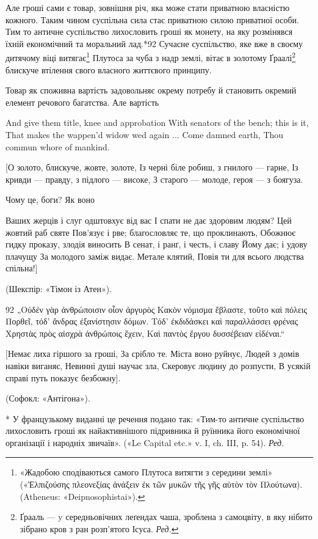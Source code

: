 Але гроші сами є товар, зовнішня річ, яка може стати приватною
власністю кожного. Таким чином суспільна сила стає приватною
силою приватної особи. Тим то античне суспільство лихословить
гроші як монету, на яку розмінявся їхній економічний та моральний
лад.*92 Сучасне суспільство, яке вже в своєму дитячому
віці витягає\footnote{
«Жадобою сподіваються самого Плутоса витягти з середини землі»
(«Ἐλπιζούσης  πλεονεξίας ἀνάξειν ἐκ τῶν μυκῶν τῆς γῆς αὐτὸν τὸν Πλούτωνα). (Atheneus:
«Deipnosophistai»).
} Плутоса за чуба з надр землі, вітає в золотому
Ґраалі\footnote*{
Ґрааль — y середньовічних леґендах чаша, зроблена з самоцвіту,
в яку нібито зібрано кров з ран розп’ятого Ісуса. \emph{Ред.}
} блискуче втілення свого власного життєвого принципу.

Товар як споживна вартість задовольняє окрему потребу й
становить окремий елемент речового багатства. Але вартість

And give them title, knee and approbation
With senators of the bench; this is it,
That makes the wappen’d widow wed again
... Come damned earth,
Thou commun whore of mankind.

[О золото, блискуче, жовте, золоте,
Із черні біле робиш, з гнилого — гарне,
Із кривди — правду, з підлого — високе,
З старого — молоде, героя — з боягуза.

Чому це, боги? Як воно

Ваших жерців і слуг одштовхує від вас
І спати не дає здоровим людям?
Цей жовтий раб святе
Пов’язує і рве; благословляє те, що
проклинають,
Обожнює гидку проказу, злодія виносить
В сенат, і ранґ, і честь, і славу
Йому дає; і удову плачущу
За молодого заміж видає.
Метале клятий,
Повія ти для всього людства спільна!]

(Шекспір: «Тімон із Атен»).

92 „Οὐδέν γὰρ ἀνθρώποισιν οἷον ἀργυρὸς
Κακὸν νόμισμα ἔβλαστε, τοῦτο καὶ πόλεις
Πορθεῖ, τόδ’ ἄνδρας ἐξανίστησιν δόμων.
Τόδ’ ἐκδιδάσκει καὶ παραλλάσσει φρένας
Χρηστὰς πρὸς αἰσχρὰ ἀνθρώποις ἔχειν,
Καὶ παντὸς ἔργου δυσσέβειαν εἰδέναι.“

[Немає лиха гіршого за гроші,
За срібло те. Міста воно руйнує,
Людей з домів навіки виганяє,
Невинні душі научає зла,
Скеровує людину до розпусти,
В усякій справі путь показує безбожну].

(Софокл: «Антігона»).

* У французькому виданні це речення подано так: «Тим-то
античне
суспільство лихословить гроші як найактивнішого підривника й руїнника
його економічної організації і народніх звичаїв». («Le Capital etc.» v. I,
ch. III, p. 54). \emph{Ред.}